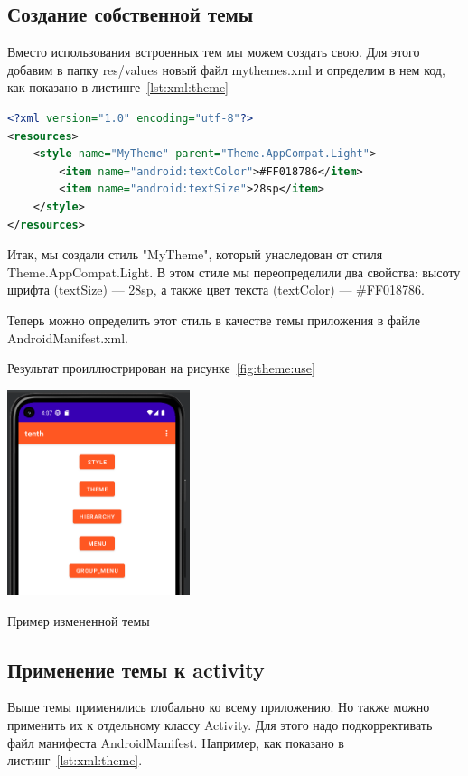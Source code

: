 \subsection{Создание собственной темы}
Вместо использования встроенных тем мы можем создать свою. Для этого
добавим в папку res/values новый файл mythemes.xml и определим в нем
код, как показано в листинге~\ref{lst:xml:theme}

\begin{lstlisting}[language=XML
	, label=lst:xml:theme
	]
<?xml version="1.0" encoding="utf-8"?>
<resources>
    <style name="MyTheme" parent="Theme.AppCompat.Light">
        <item name="android:textColor">#FF018786</item>
        <item name="android:textSize">28sp</item>
    </style>
</resources>
\end{lstlisting}

Итак, мы создали стиль "MyTheme", который унаследован от стиля
Theme.AppCompat.Light. В этом стиле мы переопределили два свойства:
высоту шрифта (textSize) --- 28sp, а также цвет текста
(textColor) --- \#FF018786.\par
Теперь можно определить этот стиль в качестве темы приложения в файле
AndroidManifest.xml.\par
Результат проиллюстрирован на рисунке~\ref{fig:theme:use}

\begin{image}
	\includegraphics[width=0.4\textwidth]{Screenshot from 2023-04-27 16-08-05}
	\caption{Пример измененной темы}
	\label{fig:theme:use}
\end{image}

\subsection{Применение темы к activity}
Выше темы применялись глобально ко всему приложению. Но также можно
применить их к отдельному классу Activity. Для этого надо подкоррективать
файл манифеста AndroidManifest. Например, как показано в 
листинг~\ref{lst:xml:theme}.

